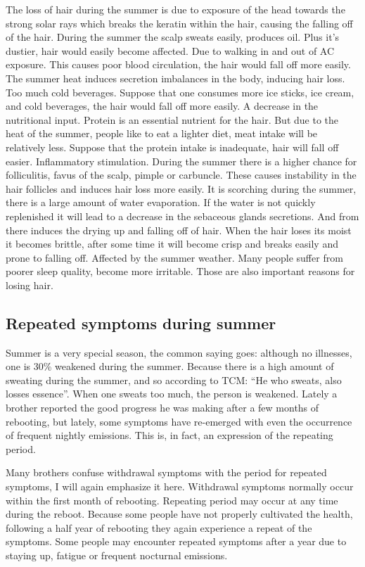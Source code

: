 \documentclass[
]{book}
\begin{document}
The loss of hair during the summer is due to exposure of the head towards the strong solar rays which breaks the keratin within the hair, causing the falling off of the hair.
During the summer the scalp sweats easily, produces oil. Plus it's dustier, hair would easily become affected.
Due to walking in and out of AC exposure. This causes poor blood circulation, the hair would fall off more easily.
The summer heat induces secretion imbalances in the body, inducing hair loss.
Too much cold beverages. Suppose that one consumes more ice sticks, ice cream, and cold beverages, the hair would fall off more easily.
A decrease in the nutritional input. Protein is an essential nutrient for the hair. But due to the heat of the summer, people like to eat a lighter diet, meat intake will be relatively less. Suppose that the protein intake is inadequate, hair will fall off easier.
Inflammatory stimulation. During the summer there is a higher chance for folliculitis, favus of the scalp, pimple or carbuncle. These causes instability in the hair follicles and induces hair loss more easily.
It is scorching during the summer, there is a large amount of water evaporation. If the water is not quickly replenished it will lead to a decrease in the sebaceous glands secretions. And from there induces the drying up and falling off of hair. When the hair loses its moist it becomes brittle, after some time it will become crisp and breaks easily and prone to falling off.
Affected by the summer weather. Many people suffer from poorer sleep quality, become more irritable. Those are also important reasons for losing hair.

\hypertarget{repeated-symptoms-during-summer}{%
\subsection{Repeated symptoms during summer}\label{repeated-symptoms-during-summer}}

Summer is a very special season, the common saying goes: although no illnesses, one is 30\% weakened during the summer. Because there is a high amount of sweating during the summer, and so according to TCM: ``He who sweats, also losses essence''. When one sweats too much, the person is weakened. Lately a brother reported the good progress he was making after a few months of rebooting, but lately, some symptoms have re-emerged with even the occurrence of frequent nightly emissions. This is, in fact, an expression of the repeating period.

Many brothers confuse withdrawal symptoms with the period for repeated symptoms, I will again emphasize it here. Withdrawal symptoms normally occur within the first month of rebooting. Repeating period may occur at any time during the reboot. Because some people have not properly cultivated the health, following a half year of rebooting they again experience a repeat of the symptoms. Some people may encounter repeated symptoms after a year due to staying up, fatigue or frequent nocturnal emissions.
\end{document}
